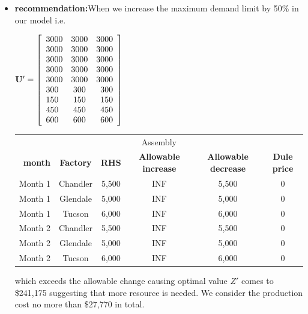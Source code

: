 \documentclass[12pt]{article}
\begin{document}
\begin{itemize}
	\item \textbf{recommendation:}When we increase the maximum demand limit by 50\% in our model i.e.

\begin{center}
$\mathbf{U'} = 
\left[
\begin{array}{l c r}
3000 & 3000& 3000 \\
3000 & 3000& 3000 \\
3000 & 3000& 3000 \\
3000 & 3000& 3000 \\
3000 & 3000& 3000 \\
300  &300  & 300  \\
150  &150  & 150  \\
450  &450  & 450  \\
600  &600  & 600  
\end{array}
\right]
$
\end{center}

\begin{center}
\begin{tabular}{c c c c c c }
\hline
\multicolumn{6}{c}{Assembly} \\
\ \textbf{month} &\textbf{Factory} &\textbf{RHS} & \textbf{Allowable increase} & \textbf{Allowable decrease} &  \textbf{Dule price}\\
\hline
Month 1     &Chandler  &5,500    &INF   &5,500    &0\\
Month 1     &Glendale  &5,000    &INF   &5,000   &0\\
Month 1     &Tucson    &6,000    &INF   &6,000 &0\\
Month 2     &Chandler  &5,500    &INF   &5,500       &0\\
Month 2     &Glendale  &5,000    &INF   &5,000     &0\\
Month 2     &Tucson    &6,000    &INF   &6,000  &0\\
\hline
\end{tabular}
\end{center}

which exceeds the allowable change causing optimal value $Z'$ comes to \$241,175 suggesting that more resource is needed. We consider the production cost no more than \$27,770 in total.
	

\end{itemize}
\end{document}

